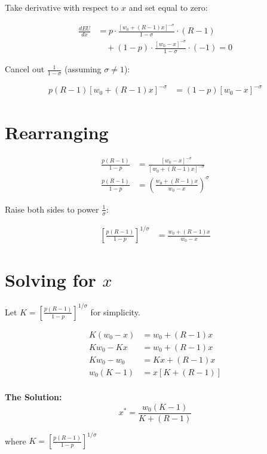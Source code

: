 \documentclass[12pt]{article}
\begin{document}
Take derivative with respect to $x$ and set equal to zero:

\begin{align*}
\frac{dEU}{dx} &= p \cdot \frac{[w_0 + (R-1)x]^{-\sigma}}{1-\sigma} \cdot (R-1) \\
&\quad + (1-p) \cdot \frac{[w_0 - x]^{-\sigma}}{1-\sigma} \cdot (-1) = 0
\end{align*}

Cancel out $\frac{1}{1-\sigma}$ (assuming $\sigma \neq 1$):

\begin{align*}
p(R-1)[w_0 + (R-1)x]^{-\sigma} &= (1-p)[w_0 - x]^{-\sigma}
\end{align*}

\section*{Rearranging}

\begin{align*}
\frac{p(R-1)}{1-p} &= \frac{[w_0 - x]^{-\sigma}}{[w_0 + (R-1)x]^{-\sigma}} \\
\frac{p(R-1)}{1-p} &= \left(\frac{w_0 + (R-1)x}{w_0 - x}\right)^{\sigma}
\end{align*}

Raise both sides to power $\frac{1}{\sigma}$:

\begin{align*}
\left[\frac{p(R-1)}{1-p}\right]^{1/\sigma} &= \frac{w_0 + (R-1)x}{w_0 - x}
\end{align*}

\newpage

\section*{Solving for $x$}

Let $K = \left[\frac{p(R-1)}{1-p}\right]^{1/\sigma}$ for simplicity.

\begin{align*}
K(w_0 - x) &= w_0 + (R-1)x \\
Kw_0 - Kx &= w_0 + (R-1)x \\
Kw_0 - w_0 &= Kx + (R-1)x \\
w_0(K - 1) &= x[K + (R-1)] \\
\end{align*}

\begin{tcolorbox}[colback=yellow!10!white,colframe=orange!75!black]
\textbf{The Solution:}
\[
\boxed{x^* = \frac{w_0(K - 1)}{K + (R-1)}}
\]

where $K = \left[\frac{p(R-1)}{1-p}\right]^{1/\sigma}$
\end{tcolorbox}
\end{document}
